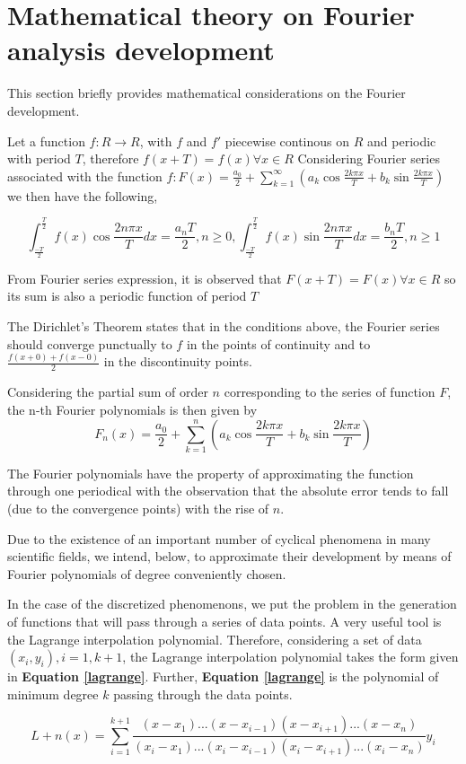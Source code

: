 \section{Mathematical theory on Fourier analysis development}

This section briefly provides mathematical considerations on the Fourier development.

Let a function $f:R \rightarrow R$, with $f$ and $f'$ piecewise continous on $R$ and periodic with period $T$, therefore $f(x+T) = f(x) \forall x \in R$ Considering Fourier series associated with the function $f: F(x) = \frac{a_0}{2} + \sum_{k=1}^{\infty} (a_k \cos \frac{2k \pi x}{T} + b_k \sin \frac{2k \pi x}{T})$ we then have the following,

\begin{equation} \label{lemma}
	\int_{\frac{-T}{2}}^{\frac{T}{2}} f(x) \cos \frac{2n\pi x}{T} dx = \frac{a_n T}{2}, n \geq 0, \int_{\frac{-T}{2}}^{\frac{T}{2}} f(x) \sin \frac{2n\pi x}{T} dx = \frac{b_n T}{2}, n\geq 1
\end{equation}

From Fourier series expression, it is observed that $F(x+T) = F(x) \forall x \in R$ so its sum is also a periodic function of period $T$

The Dirichlet's Theorem \cite{weisstein2004fourier} states that in the conditions above, the Fourier series should converge punctually to $f$ in the points of continuity and to $\frac{f(x+0) + f(x-0)}{2}$ in the discontinuity points.

Considering the partial sum of order $n$ corresponding to the series of function $F$, the
n-th Fourier polynomials is then given by 
\begin{equation}
	F_n(x) = \frac{a_0}{2} + \sum_{k=1}^{n} (a_k \cos \frac{2k\pi x}{T} + b_k \sin \frac{2k \pi x}{T})
\end{equation}

The Fourier polynomials have the property of approximating the function through one periodical with the observation that the absolute error tends to fall (due to the convergence points) with the rise of $n$. 


Due to the existence of an important number of cyclical phenomena in many
scientific fields, we intend, below, to approximate their development by means of Fourier polynomials of degree conveniently chosen. 

In the case of the discretized phenomenons, we put the problem in the generation of functions that will pass through a series of data points. A very useful tool is the Lagrange interpolation polynomial. Therefore, considering a set of data $(x_i, y_i), i = 1, k + 1$, the Lagrange interpolation polynomial takes the form given in \textbf{Equation \ref{lagrange}}. Further, \textbf{Equation \ref{lagrange}} is the polynomial of minimum degree $k$ passing through the data points.

\begin{equation} \label{lagrange}
	L+n(x) = \sum_{i=1}^{k+1} \frac{(x-x_1) ... (x-x_{i-1})(x-x_{i+1}) ...(x-x_n)}{(x_i-x_1) ... (x_i-x_{i-1})(x_i-x_{i+1}) ...(x_i-x_n)} y_i
\end{equation}

